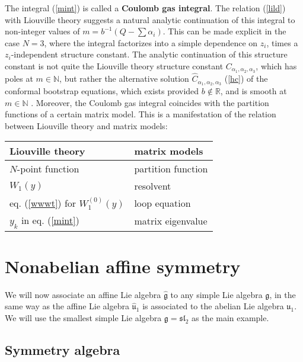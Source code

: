 \documentclass[12pt,a4paper,notitlepage]{report}
\newcommand \N {\mathbb{N}}
\newcommand \R {\mathbb{R}}
\numberwithin{equation}{section}
\theoremstyle{break}
\begin{document}
The integral (\ref{mint}) is called a \textbf{\boldmath Coulomb gas integral}. The relation (\ref{lild}) with Liouville theory suggests a natural analytic continuation of this integral to non-integer values of $m=b^{-1}(Q-\sum\alpha_i)$. This can be made explicit in the case $N=3$, where the integral factorizes into a simple dependence on $z_i$, times a $z_i$-independent structure constant. The analytic continuation of this structure constant is not quite the Liouville theory structure constant $C_{\alpha_1,\alpha_2,\alpha_3}$, which has poles at $m\in\N$, but rather the alternative solution $\hat{C}_{\alpha_1,\alpha_2,\alpha_3}$ (\ref{hc}) of the conformal bootstrap equations, which exists provided $b\notin \R$, and is smooth at $m\in\N$ \cite{zam05}. 
Moreover, the Coulomb gas integral coincides with the partition functions of a certain matrix model. This is a manifestation of the
relation between Liouville theory and matrix models:
\begin{center}
 \begin{tabular}{|l|l|}
  \hline
Liouville theory & matrix models
\\
\hline \hline
$N$-point function & partition function 
\\
\hline
$W_1(y)$  & resolvent
\\
\hline
eq. (\ref{wwwt}) for $W_1^{(0)}(y)$ & loop equation 
\\
\hline
$y_k$ in eq. (\ref{mint}) & matrix eigenvalue
\\
\hline
 \end{tabular}
\end{center}



\section{Nonabelian affine symmetry}

We will now associate an affine Lie algebra $\hat{\mathfrak{g}}$ to any simple Lie algebra $\mathfrak{g}$, in the same way as the  affine Lie algebra $\hat{\mathfrak{u}}_1$ is associated to the abelian Lie algebra $\mathfrak{u}_1$. We will use the smallest simple Lie algebra $\mathfrak{g}=\mathfrak{sl}_2$ as the main example.

\subsection{Symmetry algebra}
\end{document}
